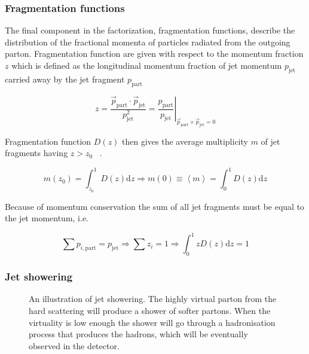 \subsubsection*{Fragmentation functions}
The final component in the factorization, fragmentation functions, describe the distribution of the fractional momenta of particles radiated from the outgoing parton. Fragmentation function are given with respect to the momentum fraction $z$ which is defined as the longitudinal momentum fraction of jet momentum $p_{\mathrm{jet}}$ carried away by the jet fragment $p_{\mathrm{part}}$


\begin{equation}
z = \frac{\vec p_{\mathrm{part}} \cdot \vec p_{\mathrm{jet}}}{p^2_{\mathrm{jet}}} = \left.\frac{p_{\mathrm{part}}}{p_{\mathrm{jet}}}\right\vert_{\vec{p}_\mathrm{part} \times \vec{p}_\mathrm{jet}=0}
\end{equation}

Fragmentation function $D\left(z\right)$ then gives the average multiplicity $m$ of jet fragments having $z > z_0$ ~\cite{missing}. 

\begin{equation}
m\left(z_0\right) = \int_{z_0}^1 D\left(z\right) \mathrm{d} z \Rightarrow m\left(0\right) \equiv \left< m \right> = \int_0^1 D\left(z\right) \mathrm{d}z
\end{equation}

Because of momentum conservation the sum of all jet fragments must be equal to the jet momentum, i.e. 

\begin{equation}
\sum p_{i,\mathrm{part}} = p_\mathrm{jet} \Rightarrow \sum z_i = 1 \Rightarrow \int_0^1 z D\left(z\right) \mathrm{d} z = 1
\end{equation}

%

\subsubsection{Jet showering}
\label{sec:shower}
\begin{figure}
\centering

\caption[Jet showering]{An illustration of jet showering. The highly virtual parton from the hard scattering will produce a shower of softer partons. When the virtuality is low enough the shower will go through a hadronisation process that produces the hadrons, which will be eventually observed in the detector. }
\label{fig:showering}
\end{figure}

